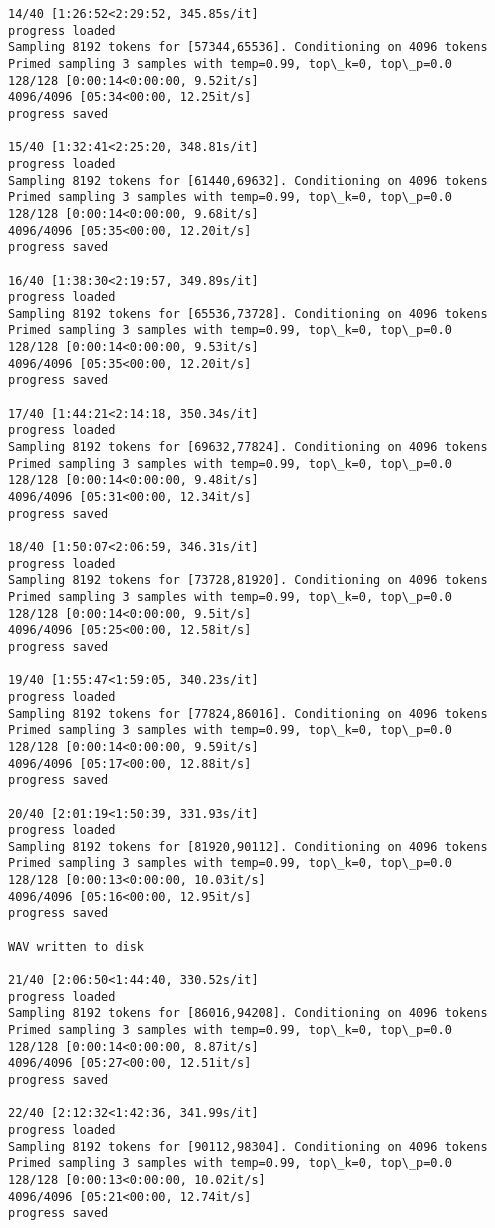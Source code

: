\documentclass[11pt]{article}
\begin{document}
\begin{Verbatim}[commandchars=\\\{\}]
14/40 [1:26:52<2:29:52, 345.85s/it]
progress loaded
Sampling 8192 tokens for [57344,65536]. Conditioning on 4096 tokens
Primed sampling 3 samples with temp=0.99, top\_k=0, top\_p=0.0
128/128 [0:00:14<0:00:00, 9.52it/s]
4096/4096 [05:34<00:00, 12.25it/s]
progress saved

15/40 [1:32:41<2:25:20, 348.81s/it]
progress loaded
Sampling 8192 tokens for [61440,69632]. Conditioning on 4096 tokens
Primed sampling 3 samples with temp=0.99, top\_k=0, top\_p=0.0
128/128 [0:00:14<0:00:00, 9.68it/s]
4096/4096 [05:35<00:00, 12.20it/s]
progress saved

16/40 [1:38:30<2:19:57, 349.89s/it]
progress loaded
Sampling 8192 tokens for [65536,73728]. Conditioning on 4096 tokens
Primed sampling 3 samples with temp=0.99, top\_k=0, top\_p=0.0
128/128 [0:00:14<0:00:00, 9.53it/s]
4096/4096 [05:35<00:00, 12.20it/s]
progress saved

17/40 [1:44:21<2:14:18, 350.34s/it]
progress loaded
Sampling 8192 tokens for [69632,77824]. Conditioning on 4096 tokens
Primed sampling 3 samples with temp=0.99, top\_k=0, top\_p=0.0
128/128 [0:00:14<0:00:00, 9.48it/s]
4096/4096 [05:31<00:00, 12.34it/s]
progress saved

18/40 [1:50:07<2:06:59, 346.31s/it]
progress loaded
Sampling 8192 tokens for [73728,81920]. Conditioning on 4096 tokens
Primed sampling 3 samples with temp=0.99, top\_k=0, top\_p=0.0
128/128 [0:00:14<0:00:00, 9.5it/s]
4096/4096 [05:25<00:00, 12.58it/s]
progress saved

19/40 [1:55:47<1:59:05, 340.23s/it]
progress loaded
Sampling 8192 tokens for [77824,86016]. Conditioning on 4096 tokens
Primed sampling 3 samples with temp=0.99, top\_k=0, top\_p=0.0
128/128 [0:00:14<0:00:00, 9.59it/s]
4096/4096 [05:17<00:00, 12.88it/s]
progress saved

20/40 [2:01:19<1:50:39, 331.93s/it]
progress loaded
Sampling 8192 tokens for [81920,90112]. Conditioning on 4096 tokens
Primed sampling 3 samples with temp=0.99, top\_k=0, top\_p=0.0
128/128 [0:00:13<0:00:00, 10.03it/s]
4096/4096 [05:16<00:00, 12.95it/s]
progress saved

WAV written to disk

21/40 [2:06:50<1:44:40, 330.52s/it]
progress loaded
Sampling 8192 tokens for [86016,94208]. Conditioning on 4096 tokens
Primed sampling 3 samples with temp=0.99, top\_k=0, top\_p=0.0
128/128 [0:00:14<0:00:00, 8.87it/s]
4096/4096 [05:27<00:00, 12.51it/s]
progress saved

22/40 [2:12:32<1:42:36, 341.99s/it]
progress loaded
Sampling 8192 tokens for [90112,98304]. Conditioning on 4096 tokens
Primed sampling 3 samples with temp=0.99, top\_k=0, top\_p=0.0
128/128 [0:00:13<0:00:00, 10.02it/s]
4096/4096 [05:21<00:00, 12.74it/s]
progress saved


\end{Verbatim}
\end{document}

